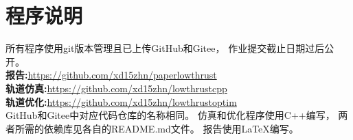\section{程序说明}
所有程序使用git版本管理且已上传GitHub和Gitee，
作业提交截止日期过后公开。\\
\textbf{报告:}\url{https://github.com/xd15zhn/paperlowthrust} \\
\textbf{轨道仿真:}\url{https://github.com/xd15zhn/lowthrustcpp} \\
\textbf{轨道优化:}\url{https://github.com/xd15zhn/lowthrustoptim} \\
GitHub和Gitee中对应代码仓库的名称相同。
仿真和优化程序使用C++编写，
两者所需的依赖库见各自的README.md文件。
报告使用\LaTeX 编写。
